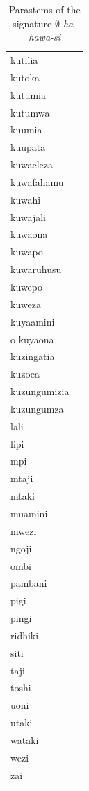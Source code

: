 \documentclass[output=paper,colorlinks,citecolor=brown]{langscibook}
\begin{document}
\begin{table}
\begin{footnotesize}
\begin{minipage}{.24\textwidth}
\begin{tabular}{ll}
kutilia \\ 
kutoka \\ 
kutumia\\
kutumwa \\ 
kuumia \\ 
kuupata \\ 
kuwaeleza \\ 
kuwafahamu \\ 
kuwahi \\ 
kuwajali \\ 
kuwaona \\ 
kuwapo \\ 
kuwaruhusu \\ 
kuwepo \\ 
kuweza \\ 
kuyaamini \\ o
kuyaona \\ 
kuzingatia \\ 
kuzoea \\ 
kuzungumizia \\ 
kuzungumza \\\hline
lali \\ 
lipi \\ 
mpi \\ 
mtaji \\ 
mtaki \\ 
muamini \\ 
mwezi \\ 
ngoji \\ 
ombi \\ 
pambani \\ 
pigi \\ 
pingi \\ 
ridhiki \\ 
siti \\ 
taji \\ 
toshi \\ 
uoni \\ 
utaki \\ 
wataki \\ 
wezi \\ 
zai \\ 
\end{tabular}
\end{minipage}
\end{footnotesize}
\caption{Parastems of the signature \textit{$\emptyset$-ha-hawa-si}}
\label{negation2}
\end{table}
\end{document}
